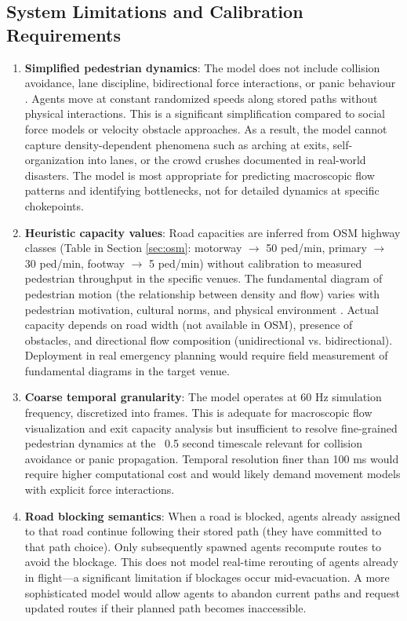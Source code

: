 \documentclass[conference]{IEEEtran}
\begin{document}
\subsection{System Limitations and Calibration Requirements}

\begin{enumerate}
\item \textbf{Simplified pedestrian dynamics}: The model does not include collision avoidance, lane discipline, bidirectional force interactions, or panic behaviour \cite{helbing2000simulating}. Agents move at constant randomized speeds along stored paths without physical interactions. This is a significant simplification compared to social force models \cite{helbing2000simulating} or velocity obstacle approaches. As a result, the model cannot capture density-dependent phenomena such as arching at exits, self-organization into lanes, or the crowd crushes documented in real-world disasters. The model is most appropriate for predicting macroscopic flow patterns and identifying bottlenecks, not for detailed dynamics at specific chokepoints.

\item \textbf{Heuristic capacity values}: Road capacities are inferred from OSM highway classes (Table in Section \ref{sec:osm}: motorway $\to$ 50 ped/min, primary $\to$ 30 ped/min, footway $\to$ 5 ped/min) without calibration to measured pedestrian throughput in the specific venues. The fundamental diagram of pedestrian motion (the relationship between density and flow) varies with pedestrian motivation, cultural norms, and physical environment \cite{seyfried2005fundamental}. Actual capacity depends on road width (not available in OSM), presence of obstacles, and directional flow composition (unidirectional vs. bidirectional). Deployment in real emergency planning would require field measurement of fundamental diagrams in the target venue.

\item \textbf{Coarse temporal granularity}: The model operates at 60 Hz simulation frequency, discretized into frames. This is adequate for macroscopic flow visualization and exit capacity analysis but insufficient to resolve fine-grained pedestrian dynamics at the ~0.5 second timescale relevant for collision avoidance or panic propagation. Temporal resolution finer than 100 ms would require higher computational cost and would likely demand movement models with explicit force interactions.

\item \textbf{Road blocking semantics}: When a road is blocked, agents already assigned to that road continue following their stored path (they have committed to that path choice). Only subsequently spawned agents recompute routes to avoid the blockage. This does not model real-time rerouting of agents already in flight—a significant limitation if blockages occur mid-evacuation. A more sophisticated model would allow agents to abandon current paths and request updated routes if their planned path becomes inaccessible.


\end{enumerate}
\end{document}
